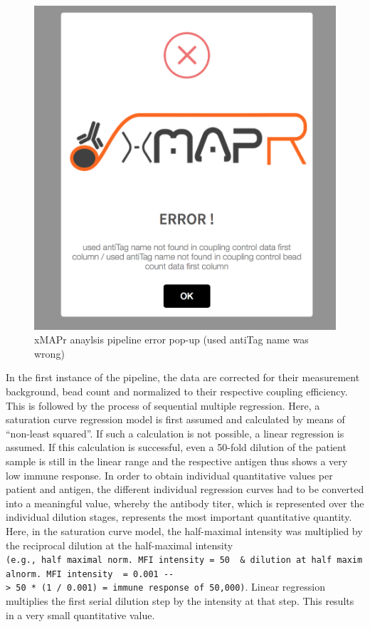 \documentclass[]{book}
\theoremstyle{definition}
\theoremstyle{definition}
\theoremstyle{definition}
\theoremstyle{remark}
\begin{document}
\begin{figure}

{\centering \includegraphics[width=15.92in]{figures/pipeline_error} 

}

\caption{xMAPr anaylsis pipeline error pop-up (used antiTag name was wrong) }\label{fig:pipelineError}
\end{figure}

In the first instance of the pipeline, the data are corrected for their
measurement background, bead count and normalized to their respective
coupling efficiency. This is followed by the process of sequential
multiple regression. Here, a saturation curve regression model is first
assumed and calculated by means of ``non-least squared''. If such a
calculation is not possible, a linear regression is assumed. If this
calculation is successful, even a 50-fold dilution of the patient sample
is still in the linear range and the respective antigen thus shows a
very low immune response. In order to obtain individual quantitative
values per patient and antigen, the different individual regression
curves had to be converted into a meaningful value, whereby the antibody
titer, which is represented over the individual dilution stages,
represents the most important quantitative quantity. Here, in the
saturation curve model, the half-maximal intensity was multiplied by the
reciprocal dilution at the half-maximal intensity
\texttt{(e.g.,\ half\ maximal\ norm.\ MFI\ intensity\ =\ 50\ \ \&\ dilution\ at\ half\ maximalnorm.\ MFI\ intensity\ \ =\ 0.001\ -\/-\textgreater{}\ 50\ *\ (1\ /\ 0.001)\ =\ immune\ response\ of\ 50,000)}.
Linear regression multiplies the first serial dilution step by the
intensity at that step. This results in a very small quantitative value.
\end{document}
